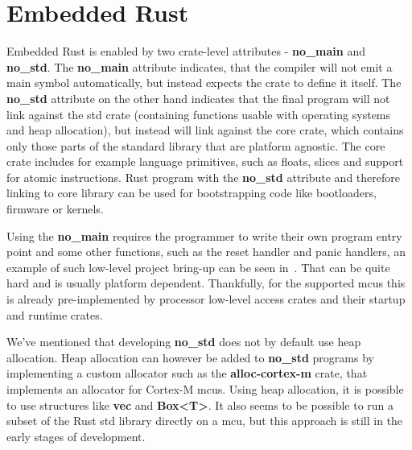 \section{Embedded Rust}
\label{sec:embedded_rust}
Embedded Rust is enabled by two crate-level attributes - \textbf{no\_main} and \textbf{no\_std}.
The \textbf{no\_main} attribute indicates, that the compiler will not emit a main symbol automatically, but instead expects the crate to define it itself\cite{noauthor_crates_2021}.
The \textbf{no\_std} attribute on the other hand indicates that the final program will not link against the std crate (containing functions usable with operating systems and heap allocation), but instead will link against the core crate, which contains only those parts of the standard library that are platform agnostic.
The core crate includes for example language primitives, such as floats, slices and support for atomic instructions.
Rust program with the \textbf{no\_std} attribute and therefore linking to core library can be used for bootstrapping code like bootloaders, firmware or kernels\cite{rust_embedded_devices_wg_introduction_2021}.

Using the \textbf{no\_main} requires the programmer to write their own program entry point and some other functions, such as the reset handler and panic handlers, an example of such low-level project bring-up can be seen in~\cite{munns_zero_2019}.
That can be quite hard and is usually platform dependent.
Thankfully, for the supported \acs{mcu}s this is already pre-implemented by processor low-level access crates and their startup and runtime crates.

We've mentioned that developing \textbf{no\_std} does not by default use heap allocation.
Heap allocation can however be added to \textbf{no\_std} programs by implementing a custom allocator such as the \textbf{alloc-cortex-m} crate\cite{rust_embedded_devices_wg_rust-embeddedalloc-cortex-m_2021}, that implements an allocator for Cortex-M \acs{mcu}s.
Using heap allocation, it is possible to use structures like \textbf{vec} and \textbf{Box<T>}\cite{noauthor_alloc_nodate}.
It also seems to be possible to run a subset of the Rust std library directly on a \acs{mcu}\cite{hutt_using_nodate}, but this approach is still in the early stages of development.

